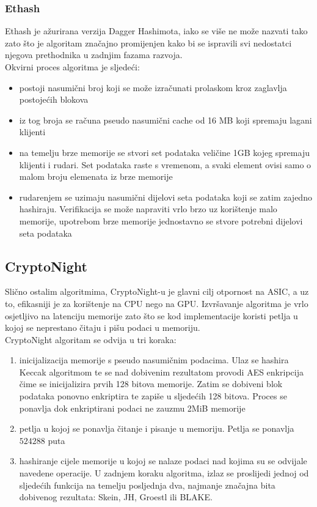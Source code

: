 \documentclass[12pt]{article}
\begin{document}
\subsubsection{Ethash}
Ethash je ažurirana verzija Dagger Hashimota, iako se više ne može nazvati tako zato što je algoritam značajno promijenjen kako bi se ispravili svi nedostatci njegova prethodnika u zadnjim fazama razvoja.\\
Okvirni proces algoritma je sljedeći:
\begin{itemize}
	\item postoji nasumični broj koji se može izračunati prolaskom kroz zaglavlja postojećih blokova 
	\item iz tog broja se računa pseudo nasumični cache od 16 MB koji spremaju lagani klijenti
	\item na temelju brze memorije se stvori set podataka veličine 1GB kojeg spremaju klijenti i rudari. Set podataka raste s vremenom, a svaki element ovisi samo o malom broju elemenata iz brze memorije
	\item rudarenjem se uzimaju nasumični dijelovi seta podataka koji se zatim zajedno hashiraju. Verifikacija se može napraviti vrlo brzo uz korištenje malo memorije, upotrebom brze memorije jednostavno se stvore potrebni dijelovi seta podataka\cite{ethash}
\end{itemize}
%

\subsection{CryptoNight}
Slično ostalim algoritmima, CryptoNight-u je glavni cilj otpornost na ASIC, a uz to, efikasniji je za korištenje na CPU nego na GPU. Izvršavanje algoritma je vrlo osjetljivo na latenciju memorije zato što se kod implementacije koristi petlja u kojoj se neprestano čitaju i pišu podaci u memoriju.\\
CryptoNight algoritam se odvija u tri koraka:
\begin{enumerate}
	\item inicijalizacija memorije s pseudo nasumičnim podacima. Ulaz se hashira Keccak algoritmom te se nad dobivenim rezultatom provodi AES enkripcija čime se inicijalizira prvih 128 bitova memorije. Zatim se dobiveni blok podataka ponovno enkriptira te zapiše u sljedećih 128 bitova. Proces se ponavlja dok enkriptirani podaci ne zauzmu 2MiB memorije
	\item petlja u kojoj se ponavlja čitanje i pisanje u memoriju. Petlja se ponavlja $524 288$ puta
	\item hashiranje cijele memorije u kojoj se nalaze podaci nad kojima su se odvijale navedene operacije. U zadnjem koraku algoritma, izlaz se proslijedi jednoj od sljedećih funkcija na temelju posljednja dva, najmanje značajna bita dobivenog rezultata: Skein, JH, Groestl ili BLAKE.\cite{cryptonighgt}
\end{enumerate}
\end{document}
